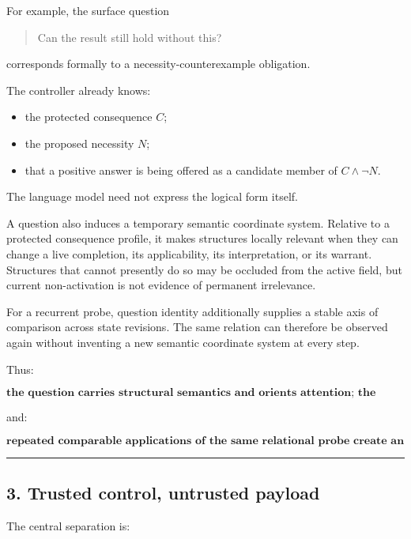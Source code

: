 \documentclass[
]{article}
\providecommand{\tightlist}{%
  \setlength{\itemsep}{0pt}\setlength{\parskip}{0pt}}
\begin{document}
For example, the surface question

\begin{quote}
Can the result still hold without this?
\end{quote}

corresponds formally to a necessity-counterexample obligation.

The controller already knows:

\begin{itemize}
\tightlist
\item
  the protected consequence \(C\);
\item
  the proposed necessity \(N\);
\item
  that a positive answer is being offered as a candidate member of
  \(C\land\neg N\).
\end{itemize}

The language model need not express the logical form itself.

A question also induces a temporary semantic coordinate system. Relative to a
protected consequence profile, it makes structures locally relevant when they
can change a live completion, its applicability, its interpretation, or its
warrant. Structures that cannot presently do so may be occluded from the active
field, but current non-activation is not evidence of permanent irrelevance.

For a recurrent probe, question identity additionally supplies a stable axis of
comparison across state revisions. The same relation can therefore be observed
again without inventing a new semantic coordinate system at every step.

Thus:

\[
\boxed{
\textbf{the question carries structural semantics and orients attention;
the answer supplies local semantic content.}
}
\]

and:

\[
\boxed{
\textbf{repeated comparable applications of the same relational probe create
an ordered perceptual trace.}
}
\]

\begin{center}\rule{0.5\linewidth}{0.5pt}\end{center}

\subsection{3. Trusted control, untrusted
payload}\label{trusted-control-untrusted-payload}

The central separation is:
\end{document}
